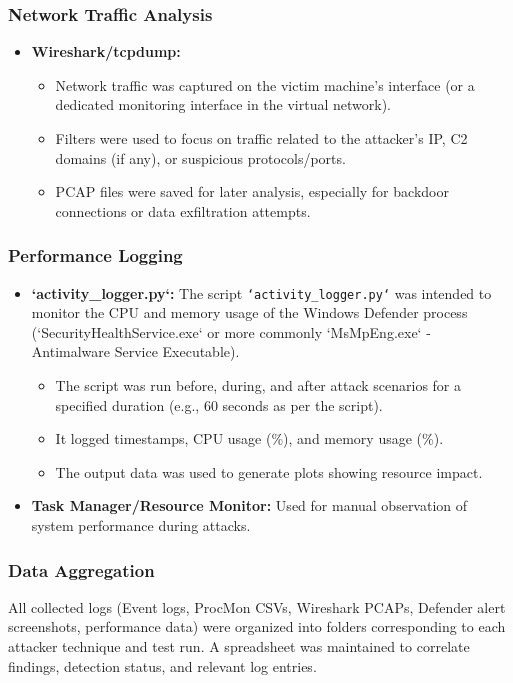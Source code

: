 \documentclass[11pt]{article}
\begin{document}
				\subsubsection{Network Traffic Analysis}
				\begin{itemize}
					\item \textbf{Wireshark/tcpdump:}
					\begin{itemize}
						\item Network traffic was captured on the victim machine's interface (or a dedicated monitoring interface in the virtual network).
						\item Filters were used to focus on traffic related to the attacker's IP, C2 domains (if any), or suspicious protocols/ports.
						\item PCAP files were saved for later analysis, especially for backdoor connections or data exfiltration attempts.
					\end{itemize}
				\end{itemize}
				
				\subsubsection{Performance Logging}
				\begin{itemize}
					\item \textbf{`activity\_logger.py`:} The script \texttt{`activity\_logger.py`} was intended to monitor the CPU and memory usage of the Windows Defender process (`SecurityHealthService.exe` or more commonly `MsMpEng.exe` - Antimalware Service Executable).
					\begin{itemize}
						\item The script was run before, during, and after attack scenarios for a specified duration (e.g., 60 seconds as per the script).
						\item It logged timestamps, CPU usage (\%), and memory usage (\%).
						\item The output data was used to generate plots showing resource impact.
					\end{itemize}
					\item \textbf{Task Manager/Resource Monitor:} Used for manual observation of system performance during attacks.
				\end{itemize}
				\subsubsection{Data Aggregation}
				All collected logs (Event logs, ProcMon CSVs, Wireshark PCAPs, Defender alert screenshots, performance data) were organized into folders corresponding to each attacker technique and test run. A spreadsheet was maintained to correlate findings, detection status, and relevant log entries.
				
\end{document}
